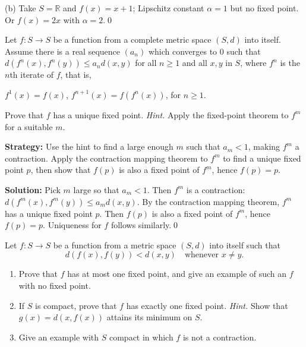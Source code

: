 (b) Take $S=\mathbb{R}$ and $f(x)=x+1$; Lipschitz constant $\alpha=1$ but no fixed point. Or $f(x)=2x$ with $\alpha=2$.\qed



\begin{problembox}
\begin{problemstatement}
Let $f: S \to S$ be a function from a complete metric space $(S, d)$ into itself. Assume there is a real sequence $(a_n)$ which converges to $0$ such that $d(f^n(x), f^n(y)) \le a_n d(x, y)$ for all $n \ge 1$ and all $x, y$ in $S$, where $f^n$ is the $n$th iterate of $f$, that is, 

$f^1(x) = f(x)$, $f^{n+1}(x) = f(f^n(x))$, for $n \ge 1$. 

Prove that $f$ has a unique fixed point. \textit{Hint.} Apply the fixed-point theorem to $f^m$ for a suitable $m$.
\end{problemstatement}
\end{problembox}

\noindent\textbf{Strategy:} Use the hint to find a large enough $m$ such that $a_m < 1$, making $f^m$ a contraction. Apply the contraction mapping theorem to $f^m$ to find a unique fixed point $p$, then show that $f(p)$ is also a fixed point of $f^m$, hence $f(p) = p$.

\bigskip\noindent\textbf{Solution:}
Pick $m$ large so that $a_m<1$. Then $f^m$ is a contraction: $d(f^m(x),f^m(y))\le a_m d(x,y)$. By the contraction mapping theorem, $f^m$ has a unique fixed point $p$. Then $f(p)$ is also a fixed point of $f^m$, hence $f(p)=p$. Uniqueness for $f$ follows similarly.\qed



\begin{problembox}
\begin{problemstatement}
Let $f: S \to S$ be a function from a metric space $(S, d)$ into itself such that
\[ d(f(x), f(y)) < d(x, y) \quad \text{whenever } x \neq y. \]
\begin{enumerate}[label=(\alph*)]
\item Prove that $f$ has at most one fixed point, and give an example of such an $f$ with no fixed point.
\item If $S$ is compact, prove that $f$ has exactly one fixed point. \textit{Hint.} Show that $g(x) = d(x, f(x))$ attains its minimum on $S$.
\item Give an example with $S$ compact in which $f$ is not a contraction.
\end{enumerate}
\end{problemstatement}
\end{problembox}

